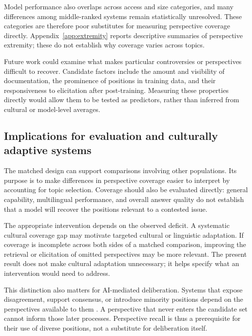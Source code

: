 \documentclass[11pt,a4paper]{article}
\begin{document}
Model performance also overlaps across access and size categories, and many differences among middle-ranked systems remain statistically unresolved. These categories are therefore poor substitutes for measuring perspective coverage directly. Appendix~\ref{app:extremity} reports descriptive summaries of perspective extremity; these do not establish why coverage varies across topics.

Future work could examine what makes particular controversies or perspectives difficult to recover. Candidate factors include the amount and visibility of documentation, the prominence of positions in training data, and their responsiveness to elicitation after post-training. Measuring these properties directly would allow them to be tested as predictors, rather than inferred from cultural or model-level averages.

\subsection{Implications for evaluation and culturally adaptive systems}
\label{sec:Implications for evaluation and culturally adaptive systems}
The matched design can support comparisons involving other populations. Its purpose is to make differences in perspective coverage easier to interpret by accounting for topic selection. Coverage should also be evaluated directly: general capability, multilingual performance, and overall answer quality do not establish that a model will recover the positions relevant to a contested issue.

The appropriate intervention depends on the observed deficit. A systematic cultural coverage gap may motivate targeted cultural or linguistic adaptation. If coverage is incomplete across both sides of a matched comparison, improving the retrieval or elicitation of omitted perspectives may be more relevant. The present result does not make cultural adaptation unnecessary; it helps specify what an intervention would need to address.

This distinction also matters for AI-mediated deliberation. Systems that expose disagreement, support consensus, or introduce minority positions depend on the perspectives available to them \cite{tesslerAICanHelp2024a, chiangEnhancingAIAssistedGroup2024b, kimDEBATEDevilsAdvocateBased2024a, leeAmplifyingMinorityVoices2025a}. A perspective that never enters the candidate set cannot inform those later processes. Perspective recall is thus a prerequisite for their use of diverse positions, not a substitute for deliberation itself.
\end{document}
